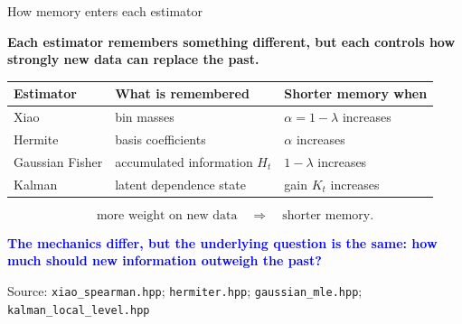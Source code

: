 \documentclass[aspectratio=169,11pt]{beamer}
\newcommand{\good}[1]{\textcolor{blue}{\textbf{#1}}}
\newcommand{\src}[1]{\vfill{\tiny\color{gray}Source: #1}}
\begin{document}
\begin{frame}{How memory enters each estimator}

  \textbf{Each estimator remembers something different, but each controls
  how strongly new data can replace the past.}

  \medskip

  \begin{center}
  \small
  \begin{tabular}{lll}
    \toprule
    Estimator & What is remembered & Shorter memory when \\
    \midrule
    Xiao
      & bin masses
      & $\alpha=1-\lambda$ increases \\

    Hermite
      & basis coefficients
      & $\alpha$ increases \\

    Gaussian Fisher
      & accumulated information $H_t$
      & $1-\lambda$ increases \\

    Kalman
      & latent dependence state
      & gain $K_t$ increases \\
    \bottomrule
  \end{tabular}
  \end{center}

  \medskip

  \[
    \text{more weight on new data}
    \quad\Longrightarrow\quad
    \text{shorter memory}.
  \]

  \good{The mechanics differ, but the underlying question is the same:
  how much should new information outweigh the past?}

  \src{\texttt{xiao\_spearman.hpp};
       \texttt{hermiter.hpp};
       \texttt{gaussian\_mle.hpp};
       \texttt{kalman\_local\_level.hpp}}
\end{frame}
\end{document}
